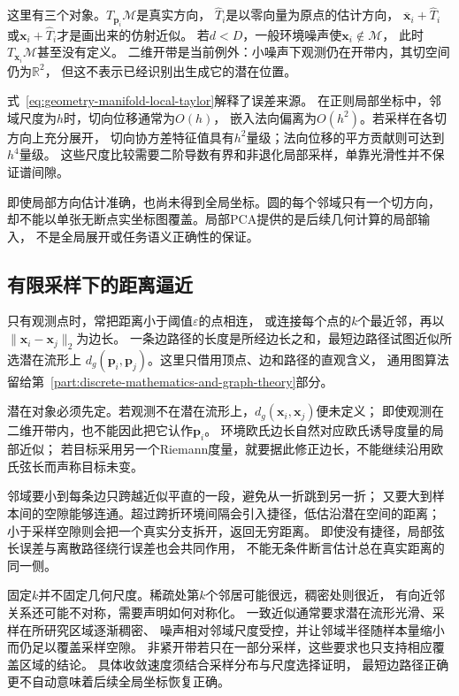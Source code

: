 这里有三个对象。$T_{\bm p_i}\mathcal M$是真实方向，
$\widehat T_i$是以零向量为原点的估计方向，
$\overline{\bm x}_i+\widehat T_i$或$\bm x_i+\widehat T_i$才是画出来的仿射近似。
若$d<D$，一般环境噪声使$\bm x_i\notin\mathcal M$，
此时$T_{\bm x_i}\mathcal M$甚至没有定义。
二维开带是当前例外：小噪声下观测仍在开带内，其切空间仍为$\mathbb R^2$，
但这不表示已经识别出生成它的潜在位置。

式~\eqref{eq:geometry-manifold-local-taylor}解释了误差来源。
在正则局部坐标中，邻域尺度为$h$时，切向位移通常为$O(h)$，
嵌入法向偏离为$O(h^2)$。若采样在各切方向上充分展开，
切向协方差特征值具有$h^2$量级；法向位移的平方贡献则可达到$h^4$量级。
这些尺度比较需要二阶导数有界和非退化局部采样，单靠光滑性并不保证谱间隙。


即使局部方向估计准确，也尚未得到全局坐标。圆的每个邻域只有一个切方向，
却不能以单张无断点实坐标图覆盖。局部PCA提供的是后续几何计算的局部输入，
不是全局展开或任务语义正确性的保证。

\subsection{有限采样下的距离逼近}
\label{sec:geometry-sampled-geodesic-distance}

只有观测点时，常把距离小于阈值$\varepsilon$的点相连，
或连接每个点的$k$个最近邻，再以$\lVert\bm x_i-\bm x_j\rVert_2$为边长。
一条边路径的长度是所经边长之和，最短边路径试图近似所选潜在流形上
$d_g(\bm p_i,\bm p_j)$。这里只借用顶点、边和路径的直观含义，
通用图算法留给第~\ref{part:discrete-mathematics-and-graph-theory}部分。

潜在对象必须先定。若观测不在潜在流形上，$d_g(\bm x_i,\bm x_j)$便未定义；
即使观测在二维开带内，也不能因此把它认作$\bm p_i$。
环境欧氏边长自然对应欧氏诱导度量的局部近似；
若目标采用另一个Riemann度量，就要据此修正边长，不能继续沿用欧氏弦长而声称目标未变。

邻域要小到每条边只跨越近似平直的一段，避免从一折跳到另一折；
又要大到样本间的空隙能够连通。超过跨折环境间隔会引入捷径，低估沿潜在空间的距离；
小于采样空隙则会把一个真实分支拆开，返回无穷距离。
即使没有捷径，局部弦长误差与离散路径绕行误差也会共同作用，
不能无条件断言估计总在真实距离的同一侧。

固定$k$并不固定几何尺度。稀疏处第$k$个邻居可能很远，稠密处则很近，
有向近邻关系还可能不对称，需要声明如何对称化。
一致近似通常要求潜在流形光滑、采样在所研究区域逐渐稠密、
噪声相对邻域尺度受控，并让邻域半径随样本量缩小而仍足以覆盖采样空隙。
非紧开带若只在一部分采样，这些要求也只支持相应覆盖区域的结论。
具体收敛速度须结合采样分布与尺度选择证明，
最短边路径正确更不自动意味着后续全局坐标恢复正确。

